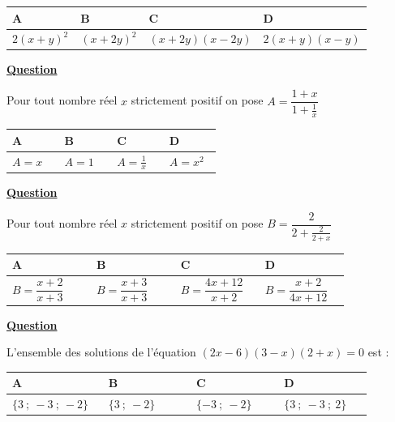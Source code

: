 \documentclass[oneside,12pt]{article}
\begin{document}
\begin{center}
	\renewcommand{\arraystretch}{1.5}
	\begin{tabular}{| P{0.22\linewidth} | P{0.22\linewidth} | P{0.22\linewidth} | P{0.22\linewidth} |} \hline
	A & B & C & D \\ \hline
	$2(x+y)^2$ & $(x+2y)^2$ & $(x+2y)(x-2y)$ & $2(x+y)(x-y)$ \\[1pt] \hline
	\end{tabular}
\end{center}



\underline{\textbf{Question }}

Pour tout nombre réel $x$ strictement positif on pose $A=\dfrac{1+x}{1+\frac{1}{x}}$

\begin{center}
	\renewcommand{\arraystretch}{1.5}
	\begin{tabular}{| P{0.22\linewidth} | P{0.22\linewidth} | P{0.22\linewidth} | P{0.22\linewidth} |} \hline
	A & B & C & D \\ \hline
	\rule{0pt}{6mm}
	$A=x$ & $A=1$ & $A=\frac{1}{x}$ & $A=x^2$ \\[1pt] \hline
	\end{tabular}
\end{center}



\underline{\textbf{Question }}

Pour tout nombre réel $x$ strictement positif on pose $B=\dfrac{2}{2+\frac{2}{2+x}}$

\begin{center}
	\renewcommand{\arraystretch}{1.35}
	\begin{tabular}{| P{0.22\linewidth} | P{0.22\linewidth} | P{0.22\linewidth} | P{0.22\linewidth} |} \hline
	A & B & C & D \\ \hline
	\rule{0pt}{8mm}
	$B=\dfrac{x+2}{x+3}$ & $B=\dfrac{x+3}{x+3}$ & $B=\dfrac{4x+12}{x+2}$ & $B=\dfrac{x+2}{4x+12}$ \\[8pt] \hline
	\end{tabular}
\end{center}



\underline{\textbf{Question }}

L'ensemble des solutions de l'équation $(2x-6)(3-x)(2+x)=0$ est :

\begin{center}
	\renewcommand{\arraystretch}{1.35}
	\begin{tabular}{| P{0.22\linewidth} | P{0.22\linewidth} | P{0.22\linewidth} | P{0.22\linewidth} |} \hline
	A & B & C & D \\ \hline
	\rule{0pt}{5mm}
	$\{3~;~-3~;~-2\}$ & $\{3~;~-2\}$ & $\{-3~;~-2\}$ & $\{3~;~-3~;~2\}$ \\[1pt] \hline
	\end{tabular}
\end{center}
\end{document}
